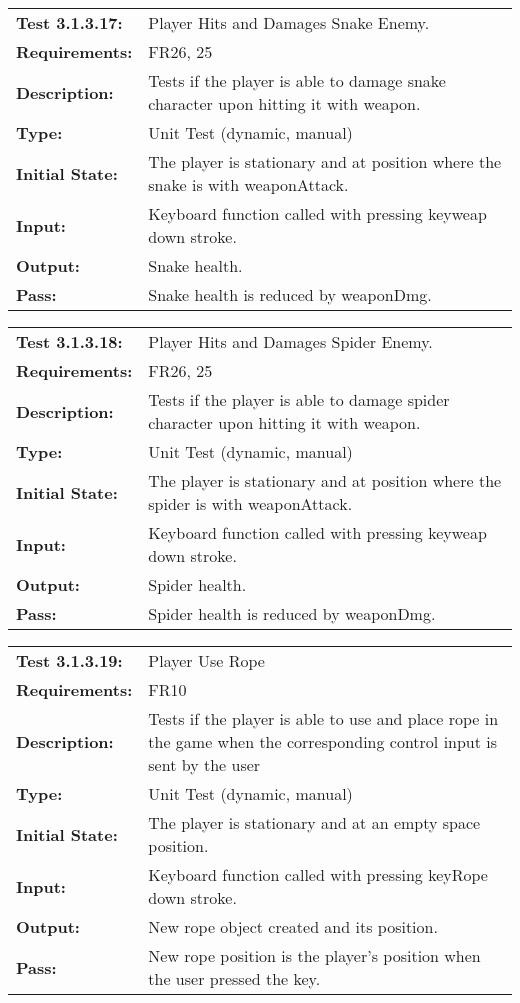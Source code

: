 \documentclass[12pt, titlepage]{article}
\begin{document}
\begin{tabular}{|l|p{10cm}|}
    \hline
    \bf{Test} 3.1.3.17: &  Player Hits and Damages Snake Enemy.\\
    \bf{Requirements}: & FR26, 25\\
    \bf{Description}: & Tests if the player is able to damage snake character upon hitting it with weapon.\\
    \bf{Type}: & Unit Test (dynamic, manual) \\
    \bf{Initial State}: & The player is stationary and at position where the snake is with weaponAttack.\\
    \bf{Input}: & Keyboard function called with pressing keyweap down stroke.\\
    \bf{Output}: & Snake health.\\
    \bf{Pass}: & Snake health is reduced by weaponDmg.\\
    \hline
\end{tabular}

\begin{tabular}{|l|p{10cm}|}
    \hline
    \bf{Test} 3.1.3.18: &  Player Hits and Damages Spider Enemy.\\
    \bf{Requirements}: & FR26, 25\\
    \bf{Description}: & Tests if the player is able to damage spider character upon hitting it with weapon.\\
    \bf{Type}: & Unit Test (dynamic, manual) \\
    \bf{Initial State}: & The player is stationary and at position where the spider is with weaponAttack.\\
    \bf{Input}: & Keyboard function called with pressing keyweap down stroke.\\
    \bf{Output}: & Spider health.\\
    \bf{Pass}: & Spider health is reduced by weaponDmg.\\
    \hline
\end{tabular}

\begin{tabular}{|l|p{10cm}|}
    \hline
    \bf{Test} 3.1.3.19: & Player Use Rope \\
    \bf{Requirements}: & FR10\\
    \bf{Description}: & Tests if the player is able to use and place rope in the game when the corresponding control input is sent by the user \\
    \bf{Type}: & Unit Test (dynamic, manual) \\
    \bf{Initial State}: & The player is stationary and at an empty space position. \\
    \bf{Input}: & Keyboard function called with pressing keyRope down stroke. \\
    \bf{Output}: & New rope object created and its  position. \\
    \bf{Pass}: & New rope position is the player's position when the user pressed the key.\\
    \hline
\end{tabular}
\end{document}
